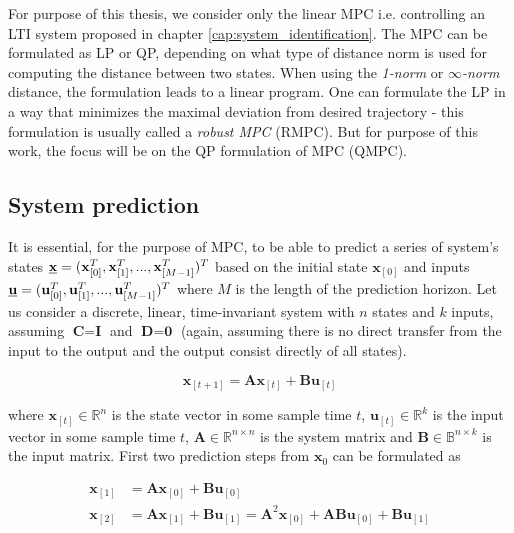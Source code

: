 For purpose of this thesis, we consider only the linear MPC i.e. controlling an LTI system proposed in chapter \ref{cap:system_identification}. The MPC can be formulated as LP or QP, depending on what type of distance norm is used for computing the distance between two states. When using the \mbox{\emph{1-norm}} or \mbox{\emph{$\infty$-norm}} distance, the formulation leads to a linear program. One can formulate the LP in a way that minimizes the maximal deviation from desired trajectory - this formulation is usually called a \emph{robust MPC} (RMPC). But for purpose of this work, the focus will be on the QP formulation of MPC (QMPC).

\subsection{System prediction}

It is essential, for the purpose of MPC, to be able to predict a series of system's states $\textbf{\underline{x}} = (\textbf{x}_{[0]}^T, \textbf{x}_{[1]}^T, ..., \textbf{x}_{[M-1]}^T)^T$ based on the initial state $\textbf{x}_{[0]}$ and inputs $\textbf{\underline{u}} = (\textbf{u}_{[0]}^T, \textbf{u}_{[1]}^T, ..., \textbf{u}_{[M-1]}^T)^T$ where $M$ is the length of the prediction horizon. Let us consider a discrete, linear, time-invariant system with $n$ states and $k$ inputs, assuming $\textbf{C} = \textbf{I}$ and $\textbf{D} = \textbf{0}$ (again, assuming there is no direct transfer from the input to the output and the output consist directly of all states).

\begin{equation}
\textbf{x}_{[t+1]} = \textbf{A}\textbf{x}_{[t]} + \textbf{B}\textbf{u}_{[t]}
\label{eq:mpc_lti_system}
\end{equation}

where $\textbf{x}_{[t]} \in \mathbb{R}^{n}$ is the state vector in some sample time $t$, $\textbf{u}_{[t]} \in \mathbb{R}^k$ is the input vector in some sample time $t$, $\textbf{A} \in \mathbb{R}^{n\times n}$ is the system matrix and $\textbf{B} \in \mathbb{B}^{n\times k}$ is the input matrix. First two prediction steps from $\textbf{x}_0$ can be formulated as

\begin{equation}
\begin{split}
\textbf{x}_{[1]} &= \textbf{A}\textbf{x}_{[0]} + \textbf{B}\textbf{u}_{[0]} \\
\textbf{x}_{[2]} &= \textbf{A}\textbf{x}_{[1]} + \textbf{B}\textbf{u}_{[1]} = \textbf{A}^2\textbf{x}_{[0]} + \textbf{A}\textbf{B}\textbf{u}_{[0]} + \textbf{B}\textbf{u}_{[1]}
\end{split}
\end{equation}

